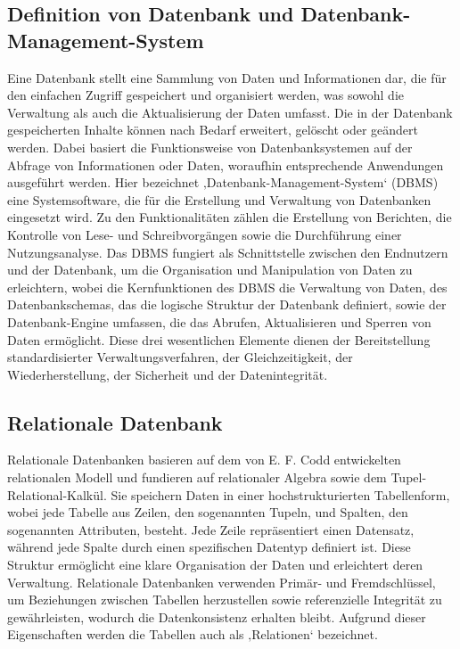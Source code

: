 \subsection{Definition von Datenbank und Datenbank-Management-System} %
\label{sec:definitiondatenbank}
Eine Datenbank stellt eine Sammlung von Daten und Informationen dar, die für den einfachen Zugriff gespeichert und organisiert werden, was sowohl die Verwaltung als auch die Aktualisierung der Daten umfasst. Die in der Datenbank gespeicherten Inhalte können nach Bedarf erweitert, gelöscht oder geändert werden. Dabei basiert die Funktionsweise von Datenbanksystemen auf der Abfrage von Informationen oder Daten, woraufhin entsprechende Anwendungen ausgeführt werden. Hier bezeichnet ‚Datenbank-Management-System‘ (DBMS) eine Systemsoftware, die für die Erstellung und Verwaltung von Datenbanken eingesetzt wird. Zu den Funktionalitäten zählen die Erstellung von Berichten, die Kontrolle von Lese- und Schreibvorgängen sowie die Durchführung einer Nutzungsanalyse. Das DBMS fungiert als Schnittstelle zwischen den Endnutzern und der Datenbank, um die Organisation und Manipulation von Daten zu erleichtern, wobei die Kernfunktionen des DBMS die Verwaltung von Daten, des Datenbankschemas, das die logische Struktur der Datenbank definiert, sowie der Datenbank-Engine umfassen, die das Abrufen, Aktualisieren und Sperren von Daten ermöglicht. Diese drei wesentlichen Elemente dienen der Bereitstellung standardisierter Verwaltungsverfahren, der Gleichzeitigkeit, der Wiederherstellung, der Sicherheit und der Datenintegrität.  \citep{9677042}


\subsection{Relationale Datenbank} %
\label{sec:relationaleDatenbanken}
Relationale Datenbanken basieren auf dem von E. F. Codd entwickelten relationalen Modell und fundieren auf relationaler Algebra sowie dem Tupel-Relational-Kalkül. Sie speichern Daten in einer hochstrukturierten Tabellenform, wobei jede Tabelle aus Zeilen, den sogenannten Tupeln, und Spalten, den sogenannten Attributen, besteht. Jede Zeile repräsentiert einen Datensatz, während jede Spalte durch einen spezifischen Datentyp definiert ist. Diese Struktur ermöglicht eine klare Organisation der Daten und erleichtert deren Verwaltung. Relationale Datenbanken verwenden Primär- und Fremdschlüssel, um Beziehungen zwischen Tabellen herzustellen sowie referenzielle Integrität zu gewährleisten, wodurch die Datenkonsistenz erhalten bleibt. Aufgrund dieser Eigenschaften werden die Tabellen auch als ‚Relationen‘ bezeichnet.

